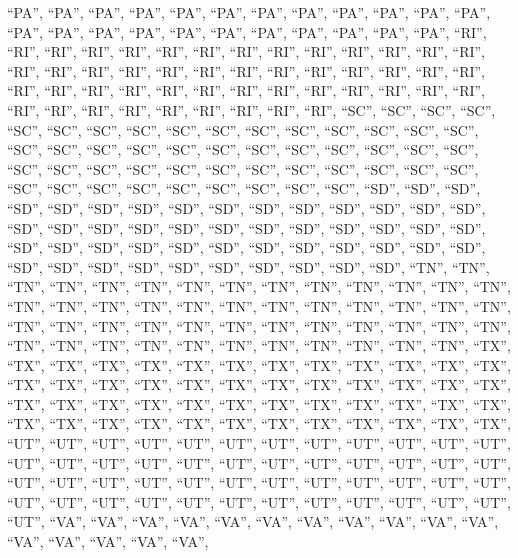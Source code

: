 \documentclass[
]{article}
\begin{document}
``PA'', ``PA'', ``PA'', ``PA'', ``PA'', ``PA'', ``PA'', ``PA'', ``PA'',
``PA'', ``PA'', ``PA'', ``PA'', ``PA'', ``PA'', ``PA'', ``PA'', ``PA'',
``PA'', ``PA'', ``PA'', ``PA'', ``PA'', ``RI'', ``RI'', ``RI'', ``RI'',
``RI'', ``RI'', ``RI'', ``RI'', ``RI'', ``RI'', ``RI'', ``RI'', ``RI'',
``RI'', ``RI'', ``RI'', ``RI'', ``RI'', ``RI'', ``RI'', ``RI'', ``RI'',
``RI'', ``RI'', ``RI'', ``RI'', ``RI'', ``RI'', ``RI'', ``RI'', ``RI'',
``RI'', ``RI'', ``RI'', ``RI'', ``RI'', ``RI'', ``RI'', ``RI'', ``RI'',
``RI'', ``RI'', ``RI'', ``RI'', ``RI'', ``RI'', ``RI'', ``RI'', ``RI'',
``SC'', ``SC'', ``SC'', ``SC'', ``SC'', ``SC'', ``SC'', ``SC'', ``SC'',
``SC'', ``SC'', ``SC'', ``SC'', ``SC'', ``SC'', ``SC'', ``SC'', ``SC'',
``SC'', ``SC'', ``SC'', ``SC'', ``SC'', ``SC'', ``SC'', ``SC'', ``SC'',
``SC'', ``SC'', ``SC'', ``SC'', ``SC'', ``SC'', ``SC'', ``SC'', ``SC'',
``SC'', ``SC'', ``SC'', ``SC'', ``SC'', ``SC'', ``SC'', ``SC'', ``SC'',
``SC'', ``SC'', ``SC'', ``SC'', ``SD'', ``SD'', ``SD'', ``SD'', ``SD'',
``SD'', ``SD'', ``SD'', ``SD'', ``SD'', ``SD'', ``SD'', ``SD'', ``SD'',
``SD'', ``SD'', ``SD'', ``SD'', ``SD'', ``SD'', ``SD'', ``SD'', ``SD'',
``SD'', ``SD'', ``SD'', ``SD'', ``SD'', ``SD'', ``SD'', ``SD'', ``SD'',
``SD'', ``SD'', ``SD'', ``SD'', ``SD'', ``SD'', ``SD'', ``SD'', ``SD'',
``SD'', ``SD'', ``SD'', ``SD'', ``SD'', ``SD'', ``SD'', ``SD'', ``TN'',
``TN'', ``TN'', ``TN'', ``TN'', ``TN'', ``TN'', ``TN'', ``TN'', ``TN'',
``TN'', ``TN'', ``TN'', ``TN'', ``TN'', ``TN'', ``TN'', ``TN'', ``TN'',
``TN'', ``TN'', ``TN'', ``TN'', ``TN'', ``TN'', ``TN'', ``TN'', ``TN'',
``TN'', ``TN'', ``TN'', ``TN'', ``TN'', ``TN'', ``TN'', ``TN'', ``TN'',
``TN'', ``TN'', ``TN'', ``TN'', ``TN'', ``TN'', ``TN'', ``TN'', ``TN'',
``TN'', ``TN'', ``TN'', ``TX'', ``TX'', ``TX'', ``TX'', ``TX'', ``TX'',
``TX'', ``TX'', ``TX'', ``TX'', ``TX'', ``TX'', ``TX'', ``TX'', ``TX'',
``TX'', ``TX'', ``TX'', ``TX'', ``TX'', ``TX'', ``TX'', ``TX'', ``TX'',
``TX'', ``TX'', ``TX'', ``TX'', ``TX'', ``TX'', ``TX'', ``TX'', ``TX'',
``TX'', ``TX'', ``TX'', ``TX'', ``TX'', ``TX'', ``TX'', ``TX'', ``TX'',
``TX'', ``TX'', ``TX'', ``TX'', ``TX'', ``TX'', ``TX'', ``UT'', ``UT'',
``UT'', ``UT'', ``UT'', ``UT'', ``UT'', ``UT'', ``UT'', ``UT'', ``UT'',
``UT'', ``UT'', ``UT'', ``UT'', ``UT'', ``UT'', ``UT'', ``UT'', ``UT'',
``UT'', ``UT'', ``UT'', ``UT'', ``UT'', ``UT'', ``UT'', ``UT'', ``UT'',
``UT'', ``UT'', ``UT'', ``UT'', ``UT'', ``UT'', ``UT'', ``UT'', ``UT'',
``UT'', ``UT'', ``UT'', ``UT'', ``UT'', ``UT'', ``UT'', ``UT'', ``UT'',
``UT'', ``UT'', ``VA'', ``VA'', ``VA'', ``VA'', ``VA'', ``VA'', ``VA'',
``VA'', ``VA'', ``VA'', ``VA'', ``VA'', ``VA'', ``VA'', ``VA'', ``VA'',
\end{document}
